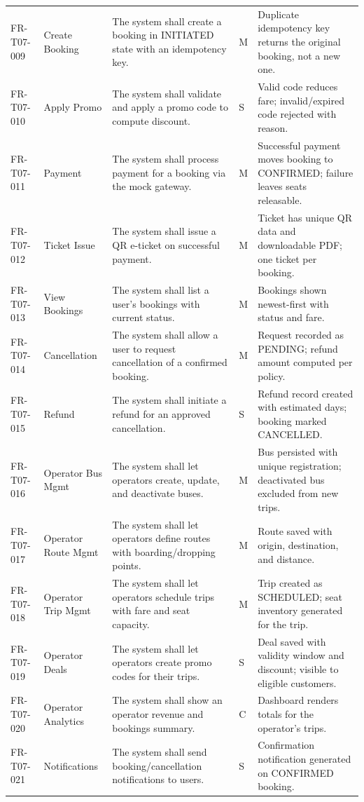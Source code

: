 \documentclass[11pt,a4paper]{article}
\begin{document}
\begin{longtable}{p{1.9cm} p{2.2cm} Y p{0.9cm} Y}
FR-T07-009 & Create Booking & The system shall create a booking in INITIATED state with an idempotency key. & M & Duplicate idempotency key returns the original booking, not a new one. \\
FR-T07-010 & Apply Promo & The system shall validate and apply a promo code to compute discount. & S & Valid code reduces fare; invalid/expired code rejected with reason. \\
FR-T07-011 & Payment & The system shall process payment for a booking via the mock gateway. & M & Successful payment moves booking to CONFIRMED; failure leaves seats releasable. \\
FR-T07-012 & Ticket Issue & The system shall issue a QR e-ticket on successful payment. & M & Ticket has unique QR data and downloadable PDF; one ticket per booking. \\
FR-T07-013 & View Bookings & The system shall list a user's bookings with current status. & M & Bookings shown newest-first with status and fare. \\
FR-T07-014 & Cancellation & The system shall allow a user to request cancellation of a confirmed booking. & M & Request recorded as PENDING; refund amount computed per policy. \\
FR-T07-015 & Refund & The system shall initiate a refund for an approved cancellation. & S & Refund record created with estimated days; booking marked CANCELLED. \\
FR-T07-016 & Operator Bus Mgmt & The system shall let operators create, update, and deactivate buses. & M & Bus persisted with unique registration; deactivated bus excluded from new trips. \\
FR-T07-017 & Operator Route Mgmt & The system shall let operators define routes with boarding/dropping points. & M & Route saved with origin, destination, and distance. \\
FR-T07-018 & Operator Trip Mgmt & The system shall let operators schedule trips with fare and seat capacity. & M & Trip created as SCHEDULED; seat inventory generated for the trip. \\
FR-T07-019 & Operator Deals & The system shall let operators create promo codes for their trips. & S & Deal saved with validity window and discount; visible to eligible customers. \\
FR-T07-020 & Operator Analytics & The system shall show an operator revenue and bookings summary. & C & Dashboard renders totals for the operator's trips. \\
FR-T07-021 & Notifications & The system shall send booking/cancellation notifications to users. & S & Confirmation notification generated on CONFIRMED booking. \\

\end{longtable}
\end{document}
